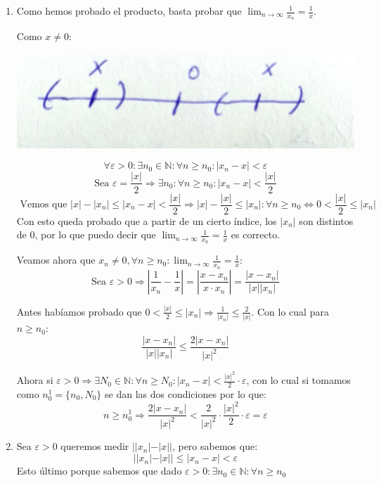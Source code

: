 \documentclass[10pt,a4paper,openright]{book}
\begin{document}
\begin{enumerate}
\item Como hemos probado el producto, basta probar que $\lim_{n\rightarrow \infty} \frac{1}{x_n}=\frac{1}{x}$.\par
Como $x\neq 0$:

\begin{center}
\includegraphics[scale=0.05]{x a cero}
\end{center}

$$\forall \varepsilon>0: \exists n_0\in \mathbb N: \forall n\geq n_0: |x_n-x|<\varepsilon$$
$$\mbox{Sea }\varepsilon=\frac{|x|}{2}\Rightarrow \exists n_0: \forall n\geq n_0: |x_n-x|<\frac{|x|}{2}$$
$$\mbox{ Vemos que } |x|-|x_n|\leq |x_n-x|<\frac{|x|}{2}\Rightarrow |x|-\frac{|x|}{2}\leq |x_n|: \forall n\geq n_0\Leftrightarrow 0< \frac{|x|}{2}\leq |x_n|$$
Con esto queda probado que a partir de un cierto índice, los $|x_n|$ son distintos de 0, por lo que puedo decir que $\lim_{n\rightarrow \infty} \frac{1}{x_n}=\frac{1}{x}$ es correcto.\par

Veamos ahora que $x_n\neq 0, \forall n\geq n_0: \lim_{n\rightarrow \infty}\frac{1}{x_n}=\frac{1}{x}$:
$$\mbox{Sea }\varepsilon>0\Rightarrow |\frac{1}{x_n}-\frac{1}{x}|=|\frac{x-x_n}{x\cdot x_n}|=\frac{|x-x_n|}{|x||x_n|}$$

Antes habíamos probado que $0< \frac{|x|}{2}\leq |x_n|\Rightarrow \frac{1}{|x_n|}\leq \frac{2}{|x|}$. Con lo cual para $n\geq n_0$:
$$\frac{|x-x_n|}{|x||x_n|}\leq \frac{2|x-x_n|}{|x|^2}$$

Ahora si $\varepsilon>0\Rightarrow \exists N_0\in \mathbb N: \forall n\geq N_0: |x_n-x|< \frac{|x|^2}{2}\cdot \varepsilon$, con lo cual si tomamos como $n_0^1=\{n_0,N_0\}$ se dan las dos condiciones por lo que:
	$$n\geq n_0^1\Rightarrow \frac{2|x-x_n|}{|x|^2}< \frac{2}{|x|^2}\cdot \frac{|x|^2}{2}\cdot \varepsilon=\varepsilon$$

\vspace{0.40cm}

\item Sea $\varepsilon>0$ queremos medir $||x_n|-|x||$, pero sabemos que:
$$||x_n|-|x||\leq |x_n-x|<\varepsilon$$
Esto último porque sabemos que dado $\varepsilon>0 : \exists n_0\in \mathbb N: \forall n\geq n_0$
\end{enumerate}
\end{document}
